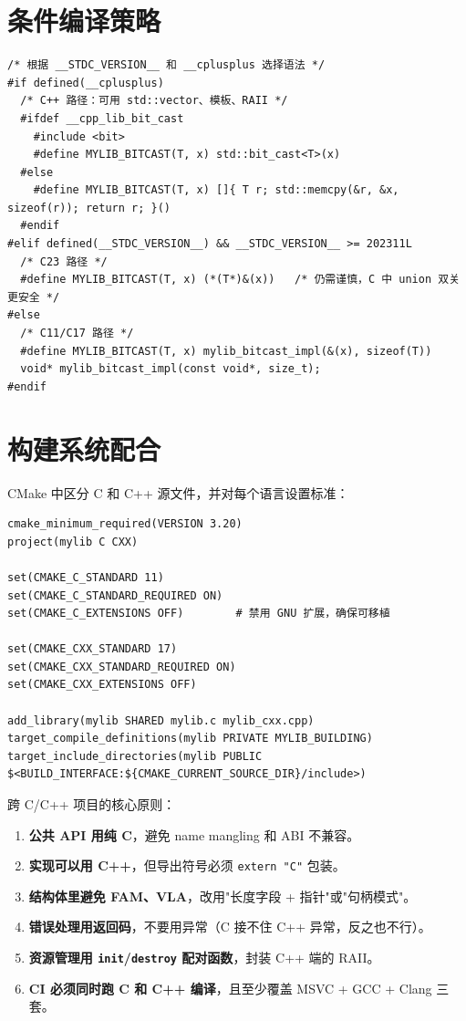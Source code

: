 \documentclass[12pt,a4paper,fontset=fandol]{ctexbook}
\newcommand{\cpp}[1]{C++#1}
\newcommand{\kw}[1]{\texttt{#1}}
\begin{document}
\section{条件编译策略}

\begin{lstlisting}
/* 根据 __STDC_VERSION__ 和 __cplusplus 选择语法 */
#if defined(__cplusplus)
  /* C++ 路径：可用 std::vector、模板、RAII */
  #ifdef __cpp_lib_bit_cast
    #include <bit>
    #define MYLIB_BITCAST(T, x) std::bit_cast<T>(x)
  #else
    #define MYLIB_BITCAST(T, x) []{ T r; std::memcpy(&r, &x, sizeof(r)); return r; }()
  #endif
#elif defined(__STDC_VERSION__) && __STDC_VERSION__ >= 202311L
  /* C23 路径 */
  #define MYLIB_BITCAST(T, x) (*(T*)&(x))   /* 仍需谨慎，C 中 union 双关更安全 */
#else
  /* C11/C17 路径 */
  #define MYLIB_BITCAST(T, x) mylib_bitcast_impl(&(x), sizeof(T))
  void* mylib_bitcast_impl(const void*, size_t);
#endif
\end{lstlisting}

\section{构建系统配合}

CMake 中区分 C 和 \cpp{} 源文件，并对每个语言设置标准：

\begin{lstlisting}[style=cmakestyle]
cmake_minimum_required(VERSION 3.20)
project(mylib C CXX)

set(CMAKE_C_STANDARD 11)
set(CMAKE_C_STANDARD_REQUIRED ON)
set(CMAKE_C_EXTENSIONS OFF)        # 禁用 GNU 扩展，确保可移植

set(CMAKE_CXX_STANDARD 17)
set(CMAKE_CXX_STANDARD_REQUIRED ON)
set(CMAKE_CXX_EXTENSIONS OFF)

add_library(mylib SHARED mylib.c mylib_cxx.cpp)
target_compile_definitions(mylib PRIVATE MYLIB_BUILDING)
target_include_directories(mylib PUBLIC $<BUILD_INTERFACE:${CMAKE_CURRENT_SOURCE_DIR}/include>)
\end{lstlisting}

\begin{bestpractice}
跨 C/\allowbreak{}\cpp{} 项目的核心原则：
\begin{enumerate}
  \item \textbf{公共 API 用纯 C}，避免 name mangling 和 ABI 不兼容。
  \item \textbf{实现可以用 \cpp{}}，但导出符号必须 \kw{extern "C"} 包装。
  \item \textbf{结构体里避免 FAM、VLA}，改用"长度字段 + 指针"或"句柄模式"。
  \item \textbf{错误处理用返回码}，不要用异常（C 接不住 \cpp{} 异常，反之也不行）。
  \item \textbf{资源管理用 \kw{init}/\allowbreak{}\kw{destroy} 配对函数}，封装 \cpp{} 端的 RAII。
  \item \textbf{CI 必须同时跑 C 和 \cpp{} 编译}，且至少覆盖 MSVC + GCC + Clang 三套。
\end{enumerate}
\end{bestpractice}
\end{document}
